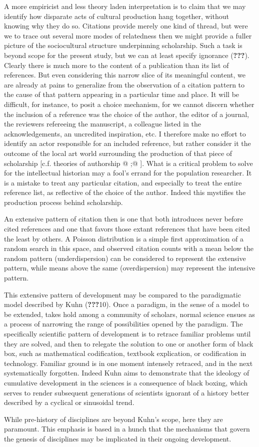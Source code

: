 A more empiricist and less theory laden interpretation is to claim that
we may identify how disparate acts of cultural production hang together,
without knowing why they do so. Citations provide merely one kind of
thread, but were we to trace out several more modes of relatedness then
we might provide a fuller picture of the sociocultural structure
underpinning scholarship. Such a task is beyond scope for the present
study, but we can at least specify ignorance ({\textbf{???}}). Clearly
there is much more to the content of a publication than its list of
references. But even considering this narrow slice of its meaningful
content, we are already at pains to generalize from the observation of a
citation pattern to the cause of that pattern appearing in a particular
time and place. It will be difficult, for instance, to posit a choice
mechanism, for we cannot discern whether the inclusion of a reference
was the choice of the author, the editor of a journal, the reviewers
refereeing the manuscript, a colleague listed in the acknowledgements,
an uncredited inspiration, etc. I therefore make no effort to identify
an actor responsible for an included reference, but rather consider it
the outcome of the local art world surrounding the production of that
piece of scholarship {[}c.f. theories of authorship @ ;@ {]}. What is a
critical problem to solve for the intellectual historian may a fool's
errand for the population researcher. It is a mistake to treat any
particular citation, and especially to treat the entire reference list,
as reflective of the choice of the author. Indeed this mystifies the
production process behind scholarship.

An extensive pattern of citation then is one that both introduces never
before cited references and one that favors those extant references that
have been cited the least by others. A Poisson distribution is a simple
first approximation of a random search in this space, and observed
citation counts with a mean below the random pattern (underdispersion)
can be considered to represent the extensive pattern, while means above
the same (overdispersion) may represent the intensive pattern.

This extensive pattern of development may be compared to the
paradigmatic model described by Kuhn ({\textbf{???}}10). Once a
paradigm, in the sense of a model to be extended, takes hold among a
community of scholars, normal science ensues as a process of narrowing
the range of possibilities opened by the paradigm. The specifically
scientific pattern of development is to retrace familiar problems until
they are solved, and then to relegate the solution to one or another
form of black box, such as mathematical codification, textbook
explication, or codification in technology. Familiar ground is in one
moment intensely retraced, and in the next systematically forgotten.
Indeed Kuhn aims to demonstrate that the ideology of cumulative
development in the sciences is a consequence of black boxing, which
serves to render subsequent generations of scientists ignorant of a
history better described by a cyclical or sinusoidal trend.

While pre-history of disciplines are beyond Kuhn's scope, here they are
paramount. This emphasis is based in a hunch that the mechanisms that
govern the genesis of disciplines may be implicated in their ongoing
development.
